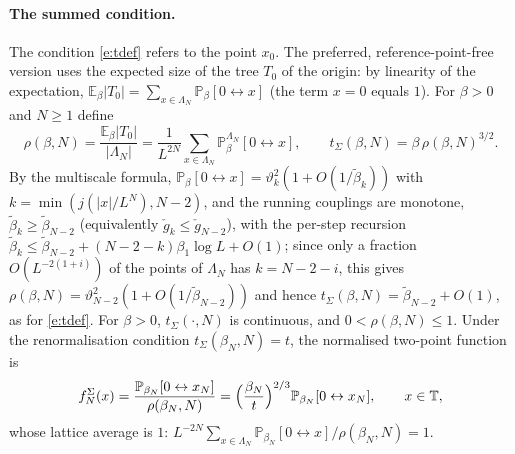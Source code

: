 \documentclass[11pt]{amsart}
\theoremstyle{definition}
\theoremstyle{remark}
\numberwithin{equation}{section}
\newcommand{\E}{\mathbb{E}}
\newcommand{\T}{\mathbb{T}}
\newcommand{\conn}{\leftrightarrow}
\begin{document}
\paragraph{The summed condition.} The condition \eqref{e:tdef} refers to the point $x_0$. The preferred,
reference-point-free version uses the expected size of the tree $T_0$ of the origin: by linearity of the expectation,
$\E_\beta|T_0|=\sum_{x\in\Lambda_N}\mathbb{P}_\beta[0\conn x]$ (the term $x=0$ equals $1$). For $\beta>0$ and $N\ge1$ define
\begin{equation}\label{e:tsum-def}
  \rho(\beta,N)=\frac{\E_\beta|T_0|}{|\Lambda_N|}=\frac1{L^{2N}}\sum_{x\in\Lambda_N}\mathbb{P}^{\Lambda_N}_\beta[0\conn x],
  \qquad t_\Sigma(\beta,N)=\beta\,\rho(\beta,N)^{3/2}.
\end{equation}
By the multiscale formula, $\mathbb{P}_\beta[0\conn x]=\vartheta_{k}^2(1+O(1/\tilde\beta_{k}))$ with $k=\min(j(|x|/L^N),N-2)$,
and the running couplings are monotone, $\tilde\beta_k\ge\tilde\beta_{N-2}$ (equivalently $\check g_k\le\check g_{N-2}$),
with the per-step recursion $\tilde\beta_k\le\tilde\beta_{N-2}+(N-2-k)\beta_1\log L+O(1)$; since only a fraction
$O(L^{-2(1+i)})$ of the points of $\Lambda_N$ has $k=N-2-i$, this gives
$\rho(\beta,N)=\vartheta_{N-2}^2(1+O(1/\tilde\beta_{N-2}))$ and hence $t_\Sigma(\beta,N)=\tilde\beta_{N-2}+O(1)$, as for
\eqref{e:tdef}. For $\beta>0$, $t_\Sigma(\cdot,N)$ is continuous, and $0<\rho(\beta,N)\le1$. Under the renormalisation
condition $t_\Sigma(\beta_N,N)=t$, the normalised two-point function is
\begin{equation}\label{e:fN-sum}
  f^\Sigma_N(x)=\frac{\mathbb{P}_{\beta_N}[0\conn x_N]}{\rho(\beta_N,N)}=\Bigl(\frac{\beta_N}{t}\Bigr)^{2/3}\mathbb{P}_{\beta_N}[0\conn x_N],
  \qquad x\in\T,
\end{equation}
whose lattice average is $1$: $L^{-2N}\sum_{x\in\Lambda_N}\mathbb{P}_{\beta_N}[0\conn x]/\rho(\beta_N,N)=1$.
\end{document}

